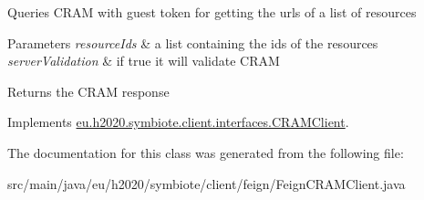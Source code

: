 Queries C\+R\+AM with guest token for getting the urls of a list of resources


\begin{DoxyParams}{Parameters}
{\em resource\+Ids} & a list containing the ids of the resources \\
\hline
{\em server\+Validation} & if true it will validate C\+R\+AM \\
\hline
\end{DoxyParams}
\begin{DoxyReturn}{Returns}
the C\+R\+AM response 
\end{DoxyReturn}


Implements \hyperlink{interfaceeu_1_1h2020_1_1symbiote_1_1client_1_1interfaces_1_1CRAMClient_a6786832b14a691accf53af3c825ae7e2}{eu.\+h2020.\+symbiote.\+client.\+interfaces.\+C\+R\+A\+M\+Client}.



The documentation for this class was generated from the following file\+:\begin{DoxyCompactItemize}
\item 
src/main/java/eu/h2020/symbiote/client/feign/Feign\+C\+R\+A\+M\+Client.\+java\end{DoxyCompactItemize}
